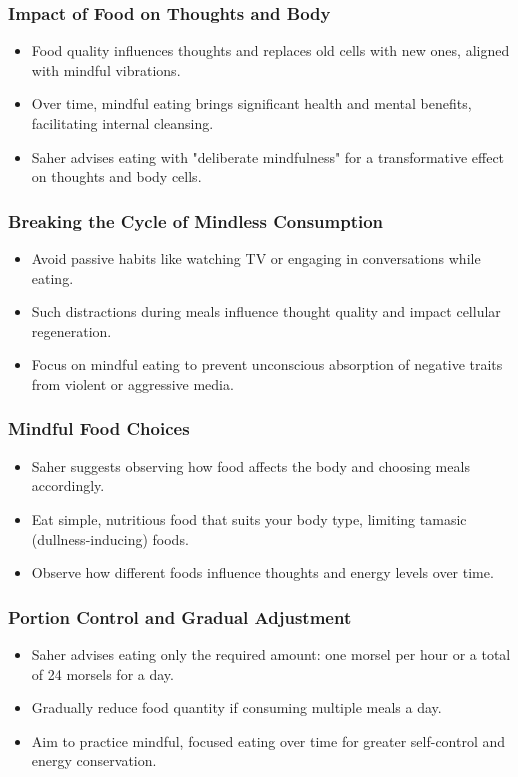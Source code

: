 \begin{frame}[fragile]\frametitle{Impact of Food on Thoughts and Body}
    \begin{itemize}
        \item Food quality influences thoughts and replaces old cells with new ones, aligned with mindful vibrations.
        \item Over time, mindful eating brings significant health and mental benefits, facilitating internal cleansing.
        \item Saher advises eating with "deliberate mindfulness" for a transformative effect on thoughts and body cells.
    \end{itemize}
\end{frame}

\begin{frame}[fragile]\frametitle{Breaking the Cycle of Mindless Consumption}
    \begin{itemize}
        \item Avoid passive habits like watching TV or engaging in conversations while eating.
        \item Such distractions during meals influence thought quality and impact cellular regeneration.
        \item Focus on mindful eating to prevent unconscious absorption of negative traits from violent or aggressive media.
    \end{itemize}
\end{frame}

\begin{frame}[fragile]\frametitle{Mindful Food Choices}
    \begin{itemize}
        \item Saher suggests observing how food affects the body and choosing meals accordingly.
        \item Eat simple, nutritious food that suits your body type, limiting tamasic (dullness-inducing) foods.
        \item Observe how different foods influence thoughts and energy levels over time.
    \end{itemize}
\end{frame}

\begin{frame}[fragile]\frametitle{Portion Control and Gradual Adjustment}
    \begin{itemize}
        \item Saher advises eating only the required amount: one morsel per hour or a total of 24 morsels for a day.
        \item Gradually reduce food quantity if consuming multiple meals a day.
        \item Aim to practice mindful, focused eating over time for greater self-control and energy conservation.
    \end{itemize}
\end{frame}

